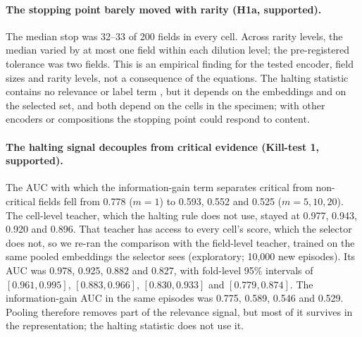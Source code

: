 \documentclass[11pt]{article}
\theoremstyle{remark}
\theoremstyle{definition}
\begin{document}
\paragraph{The stopping point barely moved with rarity (H1a, supported).} The median stop was 32--33 of 200 fields in every cell. Across rarity levels, the median varied by at most one field within each dilution level; the pre-registered tolerance was two fields. This is an empirical finding for the tested encoder, field sizes and rarity levels, not a consequence of the equations. The halting statistic contains no relevance or label term \cite{mittal2026infodpp}, but it depends on the embeddings and on the selected set, and both depend on the cells in the specimen; with other encoders or compositions the stopping point could respond to content.

\paragraph{The halting signal decouples from critical evidence (Kill-test 1, supported).} The AUC with which the information-gain term separates critical from non-critical fields fell from 0.778 ($m=1$) to 0.593, 0.552 and 0.525 ($m=5,10,20$). The cell-level teacher, which the halting rule does not use, stayed at 0.977, 0.943, 0.920 and 0.896. That teacher has access to every cell's score, which the selector does not, so we re-ran the comparison with the field-level teacher, trained on the same pooled embeddings the selector sees (exploratory; 10,000 new episodes). Its AUC was 0.978, 0.925, 0.882 and 0.827, with fold-level 95\% intervals of $[0.961,0.995]$, $[0.883,0.966]$, $[0.830,0.933]$ and $[0.779,0.874]$. The information-gain AUC in the same episodes was 0.775, 0.589, 0.546 and 0.529. Pooling therefore removes part of the relevance signal, but most of it survives in the representation; the halting statistic does not use it.
\end{document}
